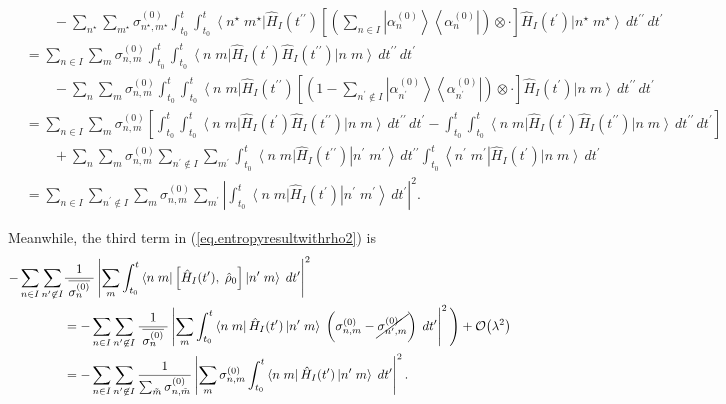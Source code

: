 \documentclass[11pt]{article}
\newcommand{\Od}[1]{\mathcal{O}{\left(#1\right)}}
\newcommand{\bra}[1]{\left\langle#1\right|}
\newcommand{\ket}[1]{\left|#1\right\rangle}
\newcommand{\op}[1]{\hat{#1}}
\newcommand{\bket}[2]{\ket{#1\;#2}}
\newcommand{\bbra}[2]{\bra{#1\;#2}}
\theoremstyle{theorem}
\theoremstyle{remark}
\theoremstyle{step}
\theoremstyle{gap}
\begin{document}
\begin{align*}
&\hspace{2em}-\sum_{n^\star} \sum_{m^\star} \sigma_{n^\star,m^\star}^{(0)}\int_{t_0}^t \int_{t_0}^{t} \bbra{n^\star}{m^\star} \op{H}_I (t^{\prime\prime})\left[\left(\sum_{n\in I} \ket{\alpha_n^{(0)}}\bra{\alpha_n^{(0)}}\right)\otimes\cdot\right]\op{H}_I (t^\prime) \bket{n^\star}{m^\star}\,dt^{\prime\prime}\,dt^\prime \\
&=\sum_{n \in I}\sum_m \sigma_{n,m}^{(0)} \int_{t_0}^t \int_{t_0}^{t} \bbra{n}{m}\op{H}_I (t^\prime) \op{H}_I(t^{\prime\prime}) \bket{n}{m}\,dt^{\prime\prime}\,dt^\prime \\
&\hspace{2em}-\sum_{n} \sum_{m} \sigma_{n,m}^{(0)}\int_{t_0}^t \int_{t_0}^{t} \bbra{n}{m} \op{H}_I (t^{\prime\prime})\left[\left(1-\sum_{n^\prime\not\in I} \ket{\alpha_{n^\prime}^{(0)}}\bra{\alpha_{n^\prime}^{(0)}}\right)\otimes\cdot\right]\op{H}_I (t^\prime) \bket{n}{m}\,dt^{\prime\prime}\,dt^\prime \\
&= \sum_{n \in I}\sum_m \sigma_{n,m}^{(0)} \left[\int_{t_0}^t \int_{t_0}^{t} \bbra{n}{m}\op{H}_I (t^\prime) \op{H}_I(t^{\prime\prime}) \bket{n}{m}\,dt^{\prime\prime}\,dt^\prime - \int_{t_0}^t \int_{t_0}^{t} \bbra{n}{m}\op{H}_I (t^\prime) \op{H}_I(t^{\prime\prime}) \bket{n}{m}\,dt^{\prime\prime}\,dt^\prime\right]\\
&\hspace{2em}+ \sum_{n} \sum_m \sigma_{n,m}^{(0)} \sum_{n^\prime \not\in I} \sum_{m^\prime} \int_{t_0}^t \bbra{n}{m} \op{H}_I (t^{\prime\prime})\bket{n^\prime}{m^\prime} \,dt^{\prime\prime}\int_{t_0}^t \bbra{n^\prime}{m^\prime} \op{H}_I (t^{\prime})\bket{n}{m}\,dt^\prime \\
&=\sum_{n \in I} \sum_{n^\prime \not\in I} \sum_m \sigma_{n,m}^{(0)} 
 \sum_{m^\prime} \left|\int_{t_0}^t \bbra{n}{m} \op{H}_I (t^{\prime})\bket{n^\prime}{m^\prime} \,dt^{\prime}\right|^2.
\end{align*}

Meanwhile, the third term in (\ref{eq.entropyresultwithrho2}) is
\begin{align*}
-\sum_{n \in I}\sum_{n^\prime \not \in I} &\frac{1}{\;\overline{\sigma_n^{(0)}}\;} \left|\sum_m\int_{t_0}^t \bbra{n}{m} \left[\op{H}_I(t^\prime),\; \op{\rho}_0 \right] \bket{n^\prime}{m}\;dt^\prime \right|^2 \\
&= -\sum_{n \in I}\sum_{n^\prime \not \in I} \frac{1}{\;\overline{\sigma_n^{(0)}}\;} \left|\sum_m\int_{t_0}^t \bbra{n}{m} \op{H}_I(t^\prime) 
 \bket{n^\prime}{m}\;\left({\sigma_{n,m}^{(0)}} - \cancel{{\sigma_{n^\prime,m}^{(0)}}}\right)\;dt^\prime \right|^2\Bigg) + \Od{\lambda^2} \\
 &= -\sum_{n \in I}\sum_{n^\prime \not \in I} \frac{1}{\sum_{\tilde{m}} \sigma_{n,\tilde{m}}^{(0)}} \left|\sum_m{\sigma_{n,m}^{(0)}}\int_{t_0}^t \bbra{n}{m} \op{H}_I(t^\prime) 
 \bket{n^\prime}{m}\;dt^\prime \right|^2.
\end{align*}
\end{document}
